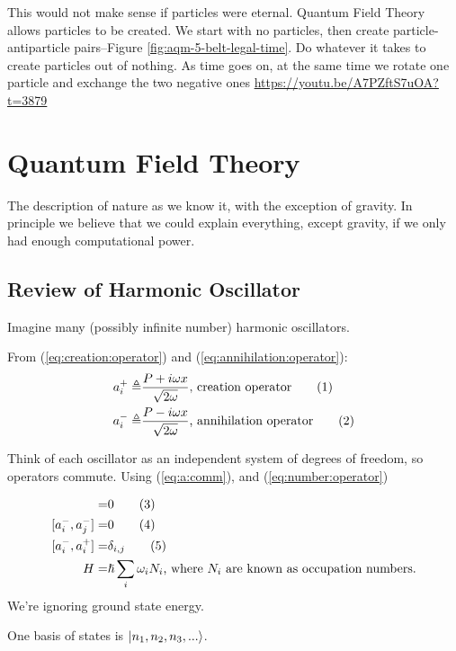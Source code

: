 \documentclass[]{article}
\newcommand\numberthis{\addtocounter{equation}{1}\tag{\theequation}}
\begin{document}
This would not make sense if particles were eternal. Quantum Field Theory allows particles to be created. We start with no particles, then create particle-antiparticle pairs--Figure \ref{fig:aqm-5-belt-legal-time}. Do whatever it takes to create particles out of nothing. As time goes on, at the same time we rotate one particle and exchange the two negative ones
\url{https://youtu.be/A7PZftS7uOA?t=3879}

\section{Quantum Field Theory}

The description of nature as we know it, with the exception of gravity. In principle we believe that we could explain everything, except gravity, if we only had enough computational power.

\subsection{Review of Harmonic Oscillator}
Imagine many (possibly infinite number) harmonic oscillators.

From (\ref{eq:creation:operator}) and (\ref{eq:annihilation:operator}):
\begin{align*}
a^+_i \triangleq & \frac{P + i \omega x } {\sqrt{2 \omega}} \text{, creation operator} \numberthis \label{eq:creation:operator:i}\\
a^-_i \triangleq & \frac{P - i \omega x } {\sqrt{2 \omega}}\text{, annihilation operator} \numberthis \label{eq:annihilation:operator_i}\\
\end{align*}

Think of each oscillator  as an independent system of degrees of freedom, so operators commute. Using  (\ref{eq:a:comm}), and (\ref{eq:number:operator})

\begin{align*}
[a^+_i,a^+_j] =& 0 \numberthis \label{eq:a:comm_i_plus}\\
[a^-_i,a^-_j] =& 0 \numberthis \label{eq:a:comm_i_minus}\\
[a^-_i,a^+_i] =& \delta_{i,j} \numberthis \label{eq:a:comm_i}\\
H =& \hslash \sum_{i}  \omega_i N_i\text{, where $N_i$ are known as occupation numbers.}
\end{align*}
We're ignoring ground state energy.

One basis of states is $\ket{n_1,n_2,n_3,...}$.
\end{document}
